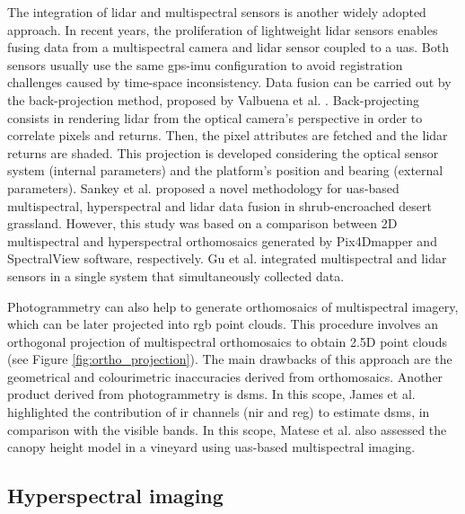 The integration of \acrshort{lidar} and multispectral sensors is another widely adopted approach. In recent years, the proliferation of lightweight \acrshort{lidar} sensors enables fusing data from a multispectral camera and \acrshort{lidar} sensor coupled to a \acrshort{uas}. Both sensors usually use the same \acrshort{gps}-\acrshort{imu} configuration to avoid registration challenges caused by time-space inconsistency. Data fusion can be carried out by the back-projection method, proposed by Valbuena et al. \cite{valbuena_integrating_2014}. Back-projecting consists in rendering \acrshort{lidar} from the optical camera’s perspective in order to correlate pixels and returns. Then, the pixel attributes are fetched and the \acrshort{lidar} returns are shaded. This projection is developed considering the optical sensor system (internal parameters) and the platform's position and bearing (external parameters). Sankey et al. \cite{sankey_quantifying_2021} proposed a novel methodology for \acrshort{uas}-based multispectral, hyperspectral and \acrshort{lidar} data fusion in shrub-encroached desert grassland. However, this study was based on a comparison between 2D multispectral and hyperspectral orthomosaics generated by Pix4Dmapper and SpectralView software, respectively. Gu et al. \cite{gu_uav-based_2020} integrated multispectral and \acrshort{lidar} sensors in a single system that simultaneously collected data. 

Photogrammetry can also help to generate orthomosaics of multispectral imagery, which can be later projected into \acrshort{rgb} point clouds. This procedure involves an orthogonal projection of multispectral orthomosaics to obtain 2.5D point clouds (see Figure \ref{fig:ortho_projection}). The main drawbacks of this approach are the geometrical and colourimetric inaccuracies derived from orthomosaics. Another product derived from photogrammetry is \acrshort{dsm}s. In this scope, James et al. \cite{james_uav_2021} highlighted the contribution of \acrshort{ir} channels (\acrshort{nir} and \acrshort{reg}) to estimate \acrshort{dsm}s, in comparison with the visible bands. In this scope, Matese et al. \cite{matese_assessment_2017} also assessed the canopy height model in a vineyard using \acrshort{uas}-based multispectral imaging.

\subsection{Hyperspectral imaging}

